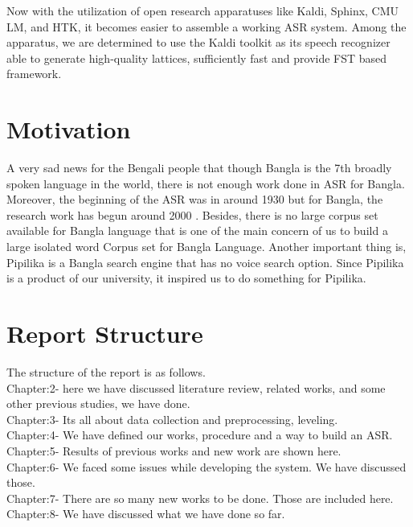 \documentclass{standalone}
\begin{document}
\par Now with the utilization of open research apparatuses like Kaldi, Sphinx, CMU LM, and HTK, it becomes easier to assemble a working ASR system. Among the apparatus, we are determined to use the Kaldi toolkit \cite{povey2011kaldi} as its speech recognizer able to generate high-quality lattices, sufficiently fast and provide FST based framework.

\section{Motivation} 
A very sad news for the Bengali people that though Bangla is the 7th broadly spoken language \cite{sinha2014speech} in the world, there is not enough work done in ASR for Bangla. Moreover, the beginning of the ASR was in around 1930 but for Bangla, the research work has begun around 2000 \cite{huang2014historical}. Besides, there is no large corpus set available for Bangla language that is one of the main concern of us to build a large isolated word Corpus set for Bangla Language. Another important thing is, Pipilika is a Bangla search engine that has no voice search option. Since Pipilika is a product of our university, it inspired us to do something for Pipilika.

\section{Report Structure}
The structure of the report is as follows.\\
Chapter:2-
here we have discussed literature review, related works, and some other previous studies, we have done.
\\
Chapter:3- 
Its all about data collection and preprocessing, leveling.
\\
Chapter:4- 
We have defined our works, procedure and a way to build an ASR.
\\
Chapter:5-
Results of previous works and new work are shown here.
\\
Chapter:6-
We faced some issues while developing the system. We have discussed those.
\\
Chapter:7-
There are so many new works to be done. Those are included here.
\\
Chapter:8-
We have discussed what we have done so far.
\\
\end{document}
